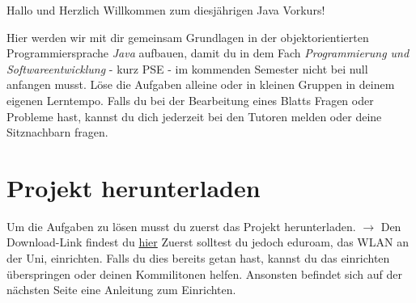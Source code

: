 \begin{center}
	Hallo und Herzlich Willkommen zum diesjährigen Java Vorkurs!\\
\end{center}
Hier werden wir mit dir gemeinsam Grundlagen in der objektorientierten Programmiersprache \textit{Java} aufbauen, damit du in dem Fach \textit{Programmierung und Softwareentwicklung} - kurz PSE - im kommenden Semester nicht bei null anfangen musst.\newline
Löse die Aufgaben alleine oder in kleinen Gruppen in deinem eigenen Lerntempo.\newline
Falls du bei der Bearbeitung eines Blatts Fragen oder Probleme hast, kannst du dich jederzeit bei den Tutoren melden oder deine Sitznachbarn fragen.\newline

\section*{Projekt herunterladen}
Um die Aufgaben zu lösen musst du zuerst das Projekt herunterladen.\newline
$\rightarrow$ Den Download-Link findest du \href{\jvkpackageurl}{hier}\newline
Zuerst solltest du jedoch eduroam, das WLAN an der Uni, einrichten. 
Falls du dies bereits getan hast, kannst du das einrichten überspringen oder deinen Kommilitonen helfen. 
Ansonsten befindet sich auf der nächsten Seite eine Anleitung zum Einrichten.
\newpage
